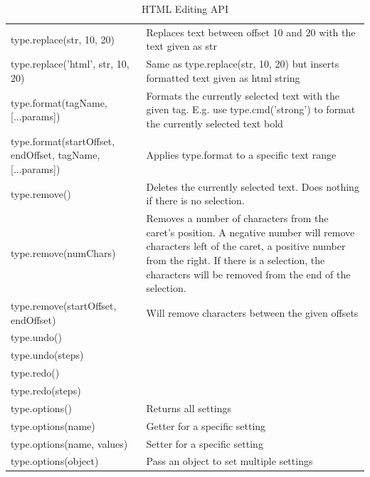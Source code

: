 \begin{landscape}
\begin{table}[]
{\begin{tabularx}{\textwidth}{|l|X|}
type.replace(str, 10, 20)	&	 Replaces text between offset 10 and 20 with the text given as str \\
type.replace('html', str, 10, 20)	&	 Same as type.replace(str, 10, 20) but inserts formatted text given as html string \\ \hline

type.format(tagName, [...params])	&	 Formats the currently selected text with the given tag. E.g. use type.cmd('strong') to format the currently selected text bold \\
type.format(startOffset, endOffset, tagName, [...params])	&	 Applies type.format to a specific text range \\ \hline

type.remove()	&	 Deletes the currently selected text. Does nothing if there is no selection. \\
type.remove(numChars)	&	 Removes a number of characters from the caret's position. A negative number will remove characters left of the caret, a positive number from the right. If there is a selection, the characters will be removed from the end of the selection. \\
type.remove(startOffset, endOffset)	&	 Will remove characters between the given offsets \\ \hline

type.undo()	&	  \\
type.undo(steps)	&	  \\
type.redo()	&	  \\
type.redo(steps)	&	  \\ \hline

type.options()	&	 Returns all settings \\
type.options(name)	&	 Getter for a specific setting \\
type.options(name, values)	&	 Setter for a specific setting \\
type.options({object})	&	 Pass an object to set multiple settings \\ \hline

\end{tabularx}
}
\caption{HTML Editing API}
\label{table:editing_mode_api}
\end{table}

\end{landscape}



\clearpage
\newpage


